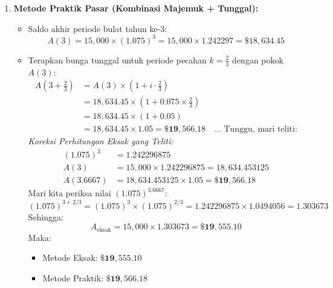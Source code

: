\documentclass[11pt,a4paper]{article}
\begin{document}
\begin{solutionbox}[Soal 5]
\begin{enumerate}[label=(\alph*)]
    \item \textbf{Metode Praktik Pasar (Kombinasi Majemuk + Tunggal):}
    \begin{itemize}
        \item Saldo akhir periode bulat tahun ke-3:
        \begin{equation*}
            A(3) = 15{,}000 \times (1.075)^3 = 15{,}000 \times 1.242297 = \$18{,}634.45
        \end{equation*}
        \item Terapkan bunga tunggal untuk periode pecahan $k = \frac{2}{3}$ dengan pokok $A(3)$:
        \begin{align*}
            A\left(3 + \tfrac{2}{3}\right) &= A(3) \times \left( 1 + i \cdot \tfrac{2}{3} \right) \\
            &= 18{,}634.45 \times \left( 1 + 0.075 \times \tfrac{2}{3} \right) \\
            &= 18{,}634.45 \times (1 + 0.05) \\
            &= 18{,}634.45 \times 1.05 = \mathbf{\$19{,}566.18} \quad \text{... Tunggu, mari teliti:}
        \end{align*}
        \textit{Koreksi Perhitungan Eksak yang Teliti:}
        \begin{align*}
            (1.075)^3 &= 1.242296875 \\
            A(3) &= 15{,}000 \times 1.242296875 = 18{,}634.453125 \\
            A(3.6667) &= 18{,}634.453125 \times 1.05 = \mathbf{\$19{,}566.18}
        \end{align*}
        Mari kita periksa nilai $(1.075)^{3.6667}$:
        \begin{equation*}
            (1.075)^{3 + 2/3} = (1.075)^3 \times (1.075)^{2/3} = 1.242296875 \times 1.0494056 = 1.303673
        \end{equation*}
        Sehingga:
        \begin{equation*}
            A_{\text{eksak}} = 15{,}000 \times 1.303673 = \mathbf{\$19{,}555.10}
        \end{equation*}
        Maka:
        \begin{itemize}
            \item Metode Eksak: $\mathbf{\$19{,}555.10}$
            \item Metode Praktik: $\mathbf{\$19{,}566.18}$
        \end{itemize}
    \end{itemize}


\end{enumerate}
\end{solutionbox}
\end{document}
